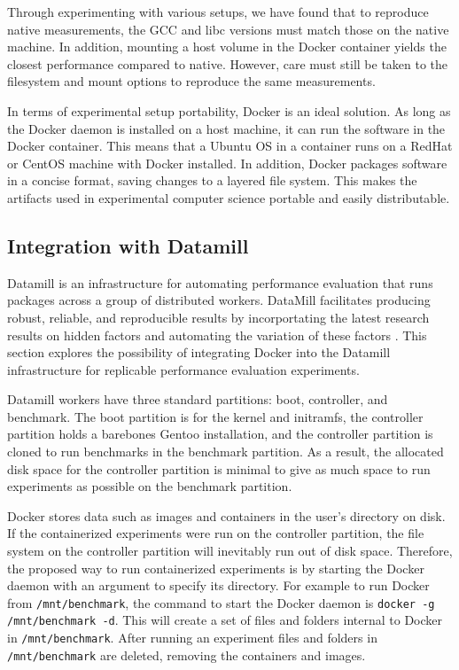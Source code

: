 \documentclass[11pt]{article}
\begin{document}
	Through experimenting with various setups, we have found that to reproduce native measurements, the GCC and libc versions must match those on the native machine. In addition, mounting a host volume in the Docker container yields the closest performance compared to native. However, care must still be taken to the filesystem and mount options to reproduce the same measurements. 
	
	In terms of experimental setup portability, Docker is an ideal solution. As long as the Docker daemon is installed on a host machine, it can run the software in the Docker container. This means that a Ubuntu OS in a container runs on a RedHat or CentOS machine with Docker installed. In addition, Docker packages software in a concise format, saving changes to a layered file system. This makes the artifacts used in experimental computer science portable and easily distributable. 
	
	\subsection{Integration with Datamill}
	
	Datamill is an infrastructure for automating performance evaluation that runs packages across a group of distributed workers. DataMill facilitates producing robust, reliable, and reproducible results by incorportating the latest research results on hidden factors and automating the variation of these factors \cite{augusto}. This section explores the possibility of integrating Docker into the Datamill infrastructure for replicable performance evaluation experiments. 
	
	Datamill workers have three standard partitions: boot, controller, and benchmark. The boot partition is for the kernel and initramfs, the controller partition holds a barebones Gentoo installation, and the controller partition is cloned to run benchmarks in the benchmark partition. As a result, the allocated disk space for the controller partition is minimal to give as much space to run experiments as possible on the benchmark partition. 
	
	Docker stores data such as images and containers in the user’s directory on disk. If the containerized experiments were run on the controller partition, the file system on the controller partition will inevitably run out of disk space. Therefore, the proposed way to run containerized experiments is by starting the Docker daemon with an argument to specify its directory. For example to run Docker from \texttt{/mnt/benchmark}, the command to start the Docker daemon is \texttt{docker -g /mnt/benchmark -d}. This will create a set of files and folders internal to Docker in \texttt{/mnt/benchmark}. After running an experiment files and folders in \texttt{/mnt/benchmark} are deleted, removing the containers and images. 
	
\end{document}
